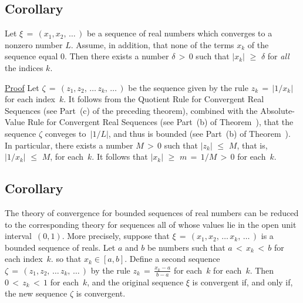 \V


            \subsection{\small{\bf Corollary}}
            \label{CorC60.20}

\V

        Let ${\xi} \,=\, (x_{1},x_{2},\,{\ldots}\,)$ be a sequence of real numbers which converges to a nonzero number $L$.
    Assume, in addition, that none of the terms $x_{k}$ of the sequence equal $0$.
    Then there exists a number ${\delta}\,>\,0$ such that $|x_{k}|\,\,{\geq}\,\,{\delta}$ for {\em all} the indices $k$.


\V

        \underline{Proof} Let ${\zeta} \,=\, (z_{1}, z_{2},\,{\ldots}\,z_{k},\,{\ldots}\,)$
    be the sequence given by the rule $z_{k} \,=\, |1/x_{k}|$ for each index~$k$.
    It follows from the Quotient Rule for Convergent Real Sequences (see Part~(c) of the preceding theorem),
    combined with the Absolute-Value Rule for Convergent Real Sequences
    (see Part~(b) of Theorem~), that the sequence ${\zeta}$ conveges to~$|1/L|$,
    and thus is bounded (see Part~(b) of Theorem~). In particular,
    there exists a number $M\,>\,0$ such that $|z_{k}|\,\,{\leq}\,\,M$, that is, $|1/x_{k}|\,\,{\leq}\,\,M$, for each~$k$.
    It follows that $|x_{k}|\,\,{\geq}\,\,m \,=\, 1/M\,>\,0$ for each~$k$.
    
\V

            \subsection{\small{\bf Corollary}}
            \label{CorC60.25}

\V

        The theory of convergence for bounded sequences of real numbers can be reduced to
    the corresponding theory for sequences all of whose values lie in the open unit interval~$(0,1)$.
    More precisely, suppose that ${\xi} \,=\, (x_{1},x_{2},\,{\ldots}\,x_{k},\,{\ldots}\,)$ is a bounded sequence of reals. Let $a$ and $b$ be numbers such that
    $a\,<\,x_{k}\,<\,b$ for each index~$k$. so that $x_{k}{\in}[a,b]$.
    Define a second sequence ${\zeta} \,=\, (z_{1}, z_{2},\,{\ldots}\,z_{k},\,{\ldots}\,)$ by the rule
    ${\displaystyle z_{k} \,=\, \frac{x_{k}-a}{b-a}}$ for each~$k$ for each~$k$. Then $0\,<\,z_{k}\,<\,1$ for each~$k$,
    and the original sequence ${\xi}$ is convergent if, and only if, the new sequence ${\zeta}$ is convergent.

